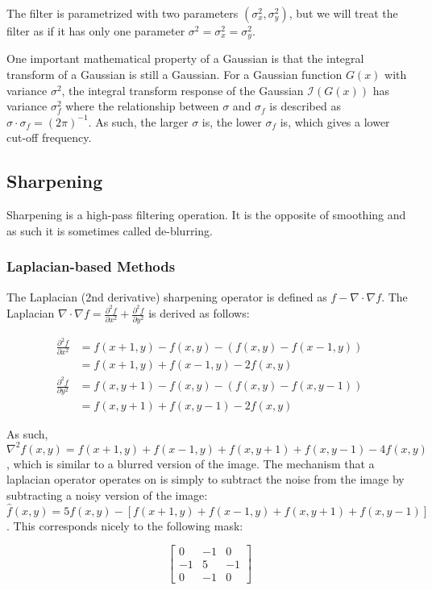 \documentclass{article}
\begin{document}
\begin{multicols}{3}
The filter is parametrized with two parameters $(\sigma^2_x,\sigma^2_y)$, but we will treat the filter as if it has only one parameter $\sigma^2 = \sigma^2_x = \sigma^2_y$.

One important mathematical property of a Gaussian is that the integral transform of a Gaussian is still a Gaussian. For a Gaussian function $G(x)$ with variance $\sigma^2$, the integral transform response of the Gaussian $\mathcal{I}(G(x))$ has variance $\sigma_f^2$ where the relationship between $\sigma$ and $\sigma_f$ is described as $\sigma \cdot \sigma_f = (2\pi)^{-1}$. As such, the larger $\sigma$ is, the lower $\sigma_f$ is, which gives a lower cut-off frequency.

\subsection{Sharpening}

Sharpening is a high-pass filtering operation. It is the opposite of smoothing and as such it is sometimes called de-blurring.

\subsubsection{Laplacian-based Methods}

The Laplacian (2nd derivative) sharpening operator is defined as $f - \nabla \cdot \nabla f$. The Laplacian $\nabla \cdot \nabla f = \frac{\partial^2f}{\partial x^2} + \frac{\partial^2f}{\partial y^2}$ is derived as follows:

\[
\begin{aligned}
  \frac{\partial^2f}{\partial x^2} &= f(x+1,y) - f(x,y) - (f(x,y) - f(x-1,y))\\
  & = f(x+1,y) + f(x-1,y) - 2f(x,y) \\ 
  \frac{\partial^2f}{\partial y^2} &= f(x,y+1) - f(x,y) - (f(x,y) - f(x,y-1))\\
  & = f(x,y+1) + f(x,y-1) - 2f(x,y)
\end{aligned}
\]

As such, $\nabla^2 f(x,y) = f(x+1,y) + f(x-1,y) + f(x,y+1) + f(x,y-1) - 4f(x,y)$, which is similar to a blurred version of the image. The mechanism that a laplacian operator operates on is simply to subtract the noise from the image by subtracting a noisy version of the image: $\hat f(x,y) = 5f(x,y) - [f(x+1,y)+f(x-1,y)+f(x,y+1)+f(x,y-1)]$. This corresponds nicely to the following mask:

$$
\begin{bmatrix}
  0 & -1 & 0\\
  -1 & 5 & -1\\
  0 & -1 & 0
\end{bmatrix}
$$


\end{multicols}
\end{document}
